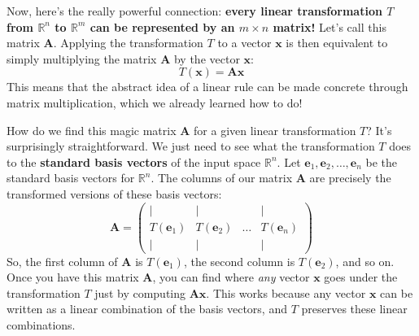 \documentclass[11pt]{article}
\begin{document}
Now, here's the really powerful connection: \textbf{every linear transformation $T$ from $\mathbb{R}^n$ to $\mathbb{R}^m$ can be represented by an $m \times n$ matrix!} Let's call this matrix $\mathbf{A}$. Applying the transformation $T$ to a vector $\mathbf{x}$ is then equivalent to simply multiplying the matrix $\mathbf{A}$ by the vector $\mathbf{x}$:
\[ T(\mathbf{x}) = \mathbf{A}\mathbf{x} \]
This means that the abstract idea of a linear rule can be made concrete through matrix multiplication, which we already learned how to do!

How do we find this magic matrix $\mathbf{A}$ for a given linear transformation $T$? It's surprisingly straightforward. We just need to see what the transformation $T$ does to the \textbf{standard basis vectors} of the input space $\mathbb{R}^n$. Let $\mathbf{e}_1, \mathbf{e}_2, \dots, \mathbf{e}_n$ be the standard basis vectors for $\mathbb{R}^n$. The columns of our matrix $\mathbf{A}$ are precisely the transformed versions of these basis vectors:
\[ \mathbf{A} = \begin{pmatrix} | & | & & | \\ T(\mathbf{e}_1) & T(\mathbf{e}_2) & \dots & T(\mathbf{e}_n) \\ | & | & & | \end{pmatrix} \]
So, the first column of $\mathbf{A}$ is $T(\mathbf{e}_1)$, the second column is $T(\mathbf{e}_2)$, and so on. Once you have this matrix $\mathbf{A}$, you can find where \textit{any} vector $\mathbf{x}$ goes under the transformation $T$ just by computing $\mathbf{A}\mathbf{x}$. This works because any vector $\mathbf{x}$ can be written as a linear combination of the basis vectors, and $T$ preserves these linear combinations.
\end{document}
